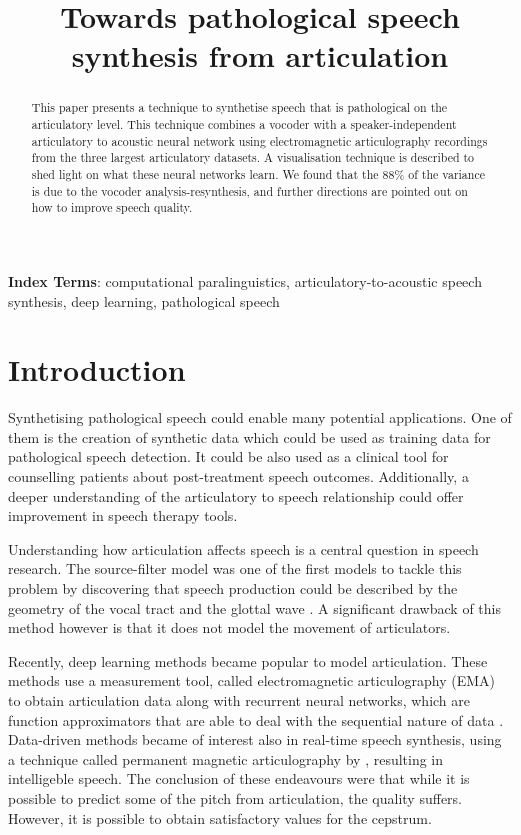 \documentclass[a4paper]{article}
\title{Towards pathological speech synthesis from articulation}
\begin{document}
\maketitle
% 
\begin{abstract}
  This paper presents a technique to synthetise speech that is pathological on the articulatory level.
  This technique combines a vocoder with a speaker-independent articulatory to acoustic neural network using electromagnetic articulography recordings from the three largest articulatory datasets.
  A visualisation technique is described to shed light on what these neural networks learn.
  We found that the 88\% of the variance is due to the vocoder analysis-resynthesis, 
  and further directions are pointed out on how to improve speech quality.
\end{abstract}
\noindent\textbf{Index Terms}: computational paralinguistics, articulatory-to-acoustic
speech synthesis, deep learning, pathological speech

\section{Introduction}

Synthetising pathological speech could enable many potential applications.
One of them is the creation of synthetic data which could be
used as training data for pathological speech detection. It could be also used as a
clinical tool for counselling patients about post-treatment speech outcomes. Additionally, a
deeper understanding of the articulatory to speech relationship could offer improvement
in speech therapy tools.

Understanding how articulation affects speech is a central question in speech
research. The source-filter model was one of the first models to tackle this
problem by discovering that speech production could be described by
the geometry of the vocal tract and the glottal wave \cite{Benesty2009} \cite{Fant1981}.
A significant drawback of this method however is that it does not model the movement of articulators.

Recently, deep learning methods became popular
to model articulation. These methods use a measurement tool,
called electromagnetic articulography (EMA) to obtain articulation data 
\cite{Aryal2016} \cite{Taguchi} \cite{Liu2018} along with recurrent
neural networks, which are function approximators that are able to deal with
the sequential nature of data \cite{Hochreiter1997}. Data-driven methods became of interest also
in real-time speech synthesis, using a technique called permanent magnetic articulography
by \cite{Gonzalez2017}, resulting in intelligeble
speech. The conclusion of these endeavours were that while it is possible to
predict some of the pitch from articulation, the quality suffers.
However, it is possible to obtain satisfactory values for the
cepstrum.
\end{document}
